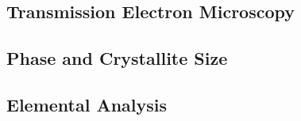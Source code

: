 \documentclass[\main/dresen_thesis.tex]{subfiles}
\renewcommand{\thisPath}{\main/chapters/monolayers/nanoparticles/}
\begin{document}
  \label{sec:monolayers:nanoparticles}

  \subsection{Transmission Electron Microscopy}
    
      \FloatBarrier

  \subsection{Phase and Crystallite Size}
  
    \FloatBarrier

  \subsection{Elemental Analysis}
  
    \FloatBarrier
\end{document}
